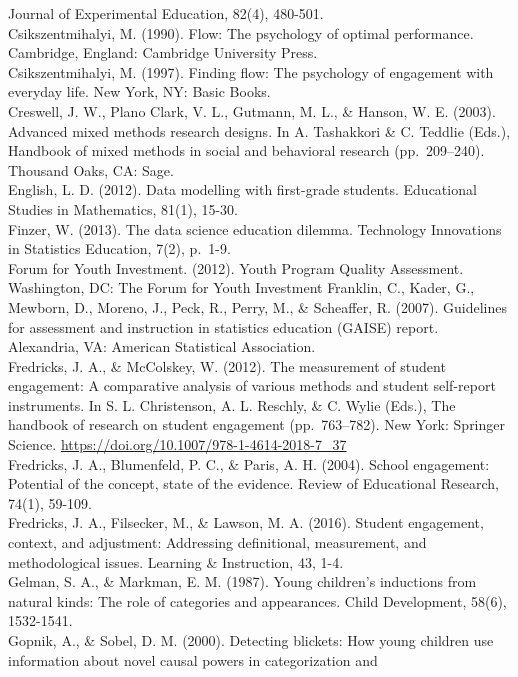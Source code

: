 \documentclass[]{msu-thesis}
\theoremstyle{definition}
\theoremstyle{definition}
\theoremstyle{definition}
\theoremstyle{remark}
\begin{document}
Journal of Experimental Education, 82(4), 480-501.\\
Csikszentmihalyi, M. (1990). Flow: The psychology of optimal
performance. Cambridge, England: Cambridge University Press.\\
Csikszentmihalyi, M. (1997). Finding flow: The psychology of engagement
with everyday life. New York, NY: Basic Books.\\
Creswell, J. W., Plano Clark, V. L., Gutmann, M. L., \& Hanson, W. E.
(2003). Advanced mixed methods research designs. In A. Tashakkori \& C.
Teddlie (Eds.), Handbook of mixed methods in social and behavioral
research (pp.~209--240). Thousand Oaks, CA: Sage.\\
English, L. D. (2012). Data modelling with first-grade students.
Educational Studies in Mathematics, 81(1), 15-30.\\
Finzer, W. (2013). The data science education dilemma. Technology
Innovations in Statistics Education, 7(2), p.~1-9.\\
Forum for Youth Investment. (2012). Youth Program Quality Assessment.
Washington, DC: The Forum for Youth Investment Franklin, C., Kader, G.,
Mewborn, D., Moreno, J., Peck, R., Perry, M., \& Scheaffer, R. (2007).
Guidelines for assessment and instruction in statistics education
(GAISE) report. Alexandria, VA: American Statistical Association.\\
Fredricks, J. A., \& McColskey, W. (2012). The measurement of student
engagement: A comparative analysis of various methods and student
self-report instruments. In S. L. Christenson, A. L. Reschly, \& C.
Wylie (Eds.), The handbook of research on student engagement
(pp.~763--782). New York: Springer Science.
\url{https://doi.org/10.1007/978-1-4614-2018-7_37}\\
Fredricks, J. A., Blumenfeld, P. C., \& Paris, A. H. (2004). School
engagement: Potential of the concept, state of the evidence. Review of
Educational Research, 74(1), 59-109.\\
Fredricks, J. A., Filsecker, M., \& Lawson, M. A. (2016). Student
engagement, context, and adjustment: Addressing definitional,
measurement, and methodological issues. Learning \& Instruction, 43,
1-4.\\
Gelman, S. A., \& Markman, E. M. (1987). Young children's inductions
from natural kinds: The role of categories and appearances. Child
Development, 58(6), 1532-1541.\\
Gopnik, A., \& Sobel, D. M. (2000). Detecting blickets: How young
children use information about novel causal powers in categorization and
\end{document}
